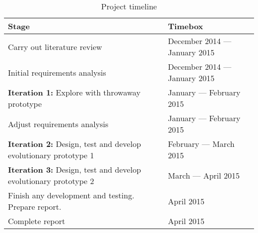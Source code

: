 \begin{table}[h]
\begin{tabular}{|p{3.4in}|p{1.5in}|}
\hline
\textbf{Stage}                                                          & \textbf{Timebox}             \\ \hline
Carry out literature review                                             & December 2014 --- \newline January 2015 \\ \hline
Initial requirements analysis                                           & December 2014 --- \newline January 2015 \\ \hline
\textbf{Iteration 1:} Explore with throwaway prototype                  & January --- \newline February 2015      \\ \hline
Adjust requirements analysis                                            & January --- \newline February 2015      \\ \hline
\textbf{Iteration 2:} Design, test and develop evolutionary prototype 1 & February --- \newline March 2015        \\ \hline
\textbf{Iteration 3:} Design, test and develop evolutionary prototype 2 & March --- \newline April 2015           \\ \hline
Finish any development and testing. Prepare report.                     & April 2015                   \\ \hline
Complete report                                                         & April 2015                   \\ \hline
\end{tabular}
\caption{Project timeline \protect {\label{tab:project_timeline}}}
\end{table}